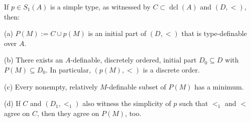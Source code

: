 \documentclass[10pt,a4paper]{amsart}
\DeclareMathOperator{\dcl}{dcl}
\begin{document}
\begin{Lemma}\label{Lemma_basic_simple}
If   $p\in S_1(A)$ is a simple type, as witnessed by $C\subset\dcl(A)$ and $(D,<)$, then:

(a) $P(M):=C\cup p(M)$ is an initial part  of $(D,<)$ that is type-definable over $A$.

(b) There exists an  $A$-definable, discretely ordered, initial part $D_0\subseteq D$  with $P(M)\subseteq D_0$. In particular, $(p(M),<)$ is a discrete order.  

(c) Every nonempty, relatively $M$-definable subset of  $P(M)$ has a  minimum.  

(d) If $C$ and $(D_1,<_1)$ also witness the simplicity of $p$ such that $<_1$ and $<$ agree on $C$, then they agree on $P(M)$, too. 
\end{Lemma}
\end{document}
